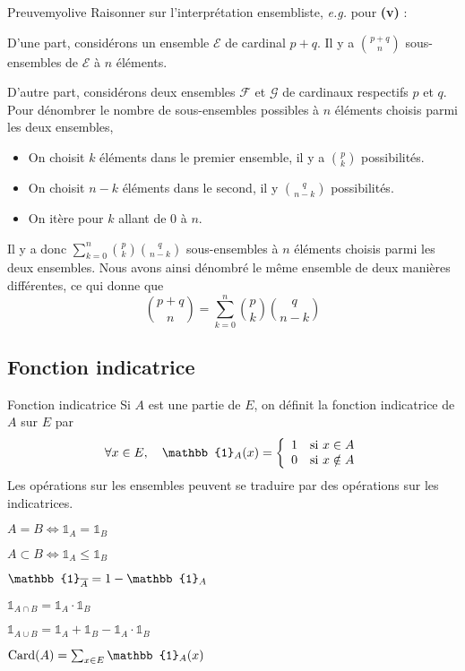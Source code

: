     \begin{demo}{Preuve}{myolive}
        Raisonner sur l’interprétation ensembliste, \textit{e.g.} pour \textbf{(v)} :

        D’une part, considérons un ensemble $\mathcal{E}$ de cardinal $p+q$. Il y a $\binom{p+q}{n}$ sous-ensembles de $\mathcal{E}$ à $n$ éléments. 

        D’autre part, considérons deux ensembles $\mathcal{F}$ et $\mathcal{G}$ de cardinaux respectifs $p$ et $q$. Pour dénombrer le nombre de sous-ensembles possibles à $n$ éléments choisis parmi les deux ensembles, 
        \begin{itemize}
            \item On choisit $k$ éléments dans le premier ensemble, il y a $\binom{p}{k}$ possibilités.
            \item On choisit $n-k$ éléments dans le second, il y $\binom{q}{n-k}$ possibilités.
            \item On itère pour $k$ allant de $0$ à $n$.
        \end{itemize}
        Il y a donc $\sum\limits_{k=0}^n \binom{p}{k} \binom{q}{n-k}$ sous-ensembles à $n$ éléments choisis parmi les deux ensembles. Nous avons ainsi dénombré le même ensemble de deux manières différentes, ce qui donne que 
        \[ \binom{p+q}{n} = \sum\limits_{k=0}^n \binom{p}{k} \binom{q}{n-k} \] 
    \end{demo}

    \subsection{Fonction indicatrice}

    \begin{defitheo}{Fonction indicatrice}{}
        Si $A$ est une partie de $E$, on définit la fonction indicatrice de $A$ sur $E$ par 
        \[ \forall x \in E, \quad \mathbb{1}_A(x) = \sisi{1}{x \in A}{0}{x \notin A} \]   
        Les opérations sur les ensembles peuvent se traduire par des opérations sur les indicatrices.
        \begin{enumerate}
            \begin{multicols}{2}
                \item $A = B \iff \mathbb{1}_A = \mathbb{1}_B$
                \item $A \subset B \iff \mathbb{1}_A \leq \mathbb{1}_B$ 
                \item $\mathbb{1}_{\barr{A}} = 1 - \mathbb{1}_A$
                \item $\mathbb{1}_{A \cap B} = \mathbb{1}_A \cdotp \mathbb{1}_B$
                \item $\mathbb{1}_{A \cup B} = \mathbb{1}_A + \mathbb{1}_B - \mathbb{1}_A \cdotp \mathbb{1}_B$
                \item $\card(A)= \sum_{x \in E} \mathbb{1}_A(x)$
            \end{multicols}
        \end{enumerate}
    \end{defitheo}

